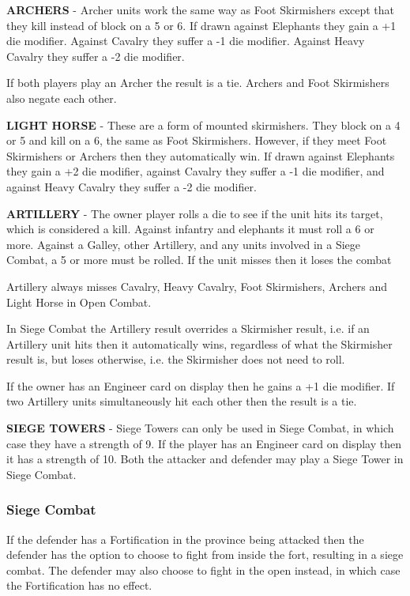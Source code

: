 \textbf{ARCHERS} - Archer units work the same way as Foot Skirmishers except that they kill instead of block on a 5 or 6. If drawn against Elephants they gain a +1 die modifier. Against Cavalry they suffer a -1 die modifier. Against Heavy Cavalry they suffer a -2 die modifier.

If both players play an Archer the result is a tie. Archers and Foot Skirmishers also negate each other.

\textbf{LIGHT HORSE} - These are a form of mounted skirmishers. They block on a 4 or 5 and kill on a 6, the same as Foot Skirmishers. However, if they meet Foot Skirmishers or Archers then they automatically win. If drawn against Elephants they gain a +2 die modifier, against Cavalry they suffer a -1 die modifier, and against Heavy Cavalry they suffer a -2 die modifier.

\textbf{ARTILLERY} - The owner player rolls a die to see if the unit hits its target, which is considered a kill. Against infantry and elephants it must roll a 6 or more. Against a Galley, other Artillery, and any units involved in a Siege Combat, a 5 or more must be rolled. If the unit misses then it loses the combat

Artillery always misses Cavalry, Heavy Cavalry, Foot Skirmishers, Archers and Light Horse in Open Combat.

In Siege Combat the Artillery result overrides a Skirmisher result, i.e. if an Artillery unit hits then it automatically wins, regardless of what the Skirmisher result is, but loses otherwise, i.e. the Skirmisher does not need to roll.

If the owner has an Engineer card on display then he gains a +1 die modifier. If two Artillery units simultaneously hit each other then the result is a tie.

\textbf{SIEGE TOWERS} - Siege Towers can only be used in Siege Combat, in which case they have a strength of 9. If the player has an Engineer card on display then it has a strength of 10. Both the attacker and defender may play a Siege Tower in Siege Combat.

\subsubsection{Siege Combat}

If the defender has a Fortification in the province being attacked then the defender has the option to choose to fight from inside the fort, resulting in a siege combat. The defender may also choose to fight in the open instead, in which case the Fortification has no effect.

